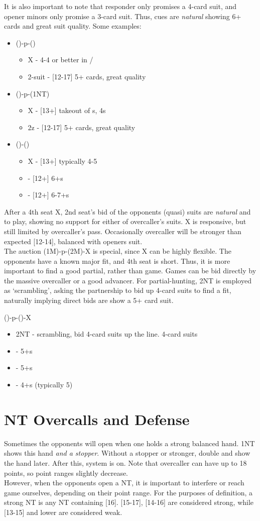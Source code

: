 \documentclass[12pt]{report}
\newcommand{\n}{\\}
\newcommand{\q}[1]{\multido{}{#1}{\qquad}}
\newcommand{\ul}[1]{\begin{itemize}#1\end{itemize}}
\newcommand{\li}[1]{\item[~] \q{#1}}
\begin{document}
    It is also important to note that responder only promises a 4-card suit, and opener minors only promise a 3-card suit.  Thus, cues are \textit{natural} showing 6+ cards and great suit quality.  Some examples:

    \ul{
        \li0 ()-p-() \ul{
            \li0 X - 4-4 or better in \di{}/\he{}
            \li0 2-suit - [12-17] 5+ cards, great quality
        }

        \li0 (\he1)-p-(1NT) \ul{
            \li0 X - [13+] takeout of \he{}s, 4\sp{}s
            \li0 2z - [12-17] 5+ cards, great quality
        }

        \li0 (\sp1)-(\di2) \ul{
            \li0 X - [13+] typically 4-5
            \li0 \he2 - [12+] 6+\he{}s
            \li0 \cl3 - [12+] 6-7+\cl{}s
        }
    }

    After a 4th seat X, 2nd seat's bid of the opponents (quasi) suits are \textit{natural} and to play, showing no support for either of overcaller's suits.  X is responsive, but still limited by overcaller's pass.  Occasionally overcaller will be stronger than expected [12-14], balanced with openers suit. \n

    The auction (1M)-p-(2M)-X is special, since X can be highly flexible.  The opponents have a known major fit, and 4th seat is short.  Thus, it is more important to find a good partial, rather than game.  Games can be bid directly by the massive overcaller or a good advancer.  For partial-hunting, 2NT is employed as `scrambling', asking the partnership to bid up 4-card suits to find a fit, naturally implying direct bids are show a 5+ card suit.

    ()-p-()-X
    \ul{
        \li0 2NT - scrambling, bid 4-card suits up the line.  4-card suits
        \li0 \cl3 - 5+\cl{}s
        \li0 \di3 - 5+\di{}s
        \li0 \he3 - 4+\he{}s (typically 5)    
    }
\section{NT Overcalls and Defense} \label{4:4}

    Sometimes the opponents will open when one holds a strong balanced hand.  1NT shows this hand \textit{and a stopper}.  Without a stopper or stronger, double and show the hand later.  After this, system is on.  Note that overcaller can have up to 18 points, so point ranges slightly decrease.\n

    However, when the opponents open a NT, it is important to interfere or reach game ourselves, depending on their point range.  For the purposes of definition, a strong NT is any NT containing [16].  [15-17], [14-16] are considered strong, while [13-15] and lower are considered weak. \n
\end{document}
